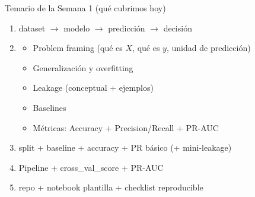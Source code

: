 \begin{frame}{Temario de la Semana 1 (qué cubrimos hoy)}

\begin{enumerate}
  \item {} dataset $\rightarrow$ modelo $\rightarrow$ predicción $\rightarrow$ decisión
  \item {}
    \begin{itemize}
      \item Problem framing (qué es $X$, qué es $y$, unidad de predicción)
      \item Generalización y overfitting
      \item Leakage (conceptual + ejemplos)
      \item Baselines
      \item Métricas: Accuracy + Precision/Recall + PR-AUC
    \end{itemize}
  \item {} split + baseline + accuracy + PR básico (+ mini-leakage)
  \item {} Pipeline + cross\_val\_score + PR-AUC
  \item {} repo + notebook plantilla + checklist reproducible
\end{enumerate}
\end{frame}

